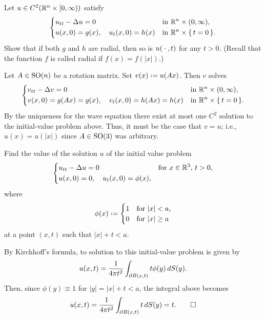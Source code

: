 \begin{problem}
  Let \(u\in C^2(\mathbb{R}^n\times[0,\infty))\) satisfy
  \[
    \left\{
      \begin{aligned}
        &u_{tt}-\Delta u=0&&\text{in \(\mathbb{R}^n\times(0,\infty),\)}\\
        &u(x,0)=g(x),\quad u_t(x,0)=h(x)&&\text{in \(\mathbb{R}^n\times\{\,t=0\,\}\).}
      \end{aligned}
    \right.
  \]
  Show that if both \(g\) and \(h\) are radial, then so is \(u({}\cdot{},t)\)
  for any \(t>0\). (Recall that the function \(f\) is called radial if
  \(f(x)=f(|x|)\).)
\end{problem}
\begin{solution*}
  Let \(A\in\operatorname{SO}(n)\) be a rotation matrix. Set \(v(x)\defeq u(Ax)\). Then
  \(v\) solves
  \[
    \left\{
      \begin{aligned}
        &v_{tt}-\Delta v=0&&\text{in \(\mathbb{R}^n\times(0,\infty),\)}\\
        &v(x,0)=g(Ax)=g(x),\quad v_t(x,0)=h(Ax)=h(x)&&\text{in
          \(\mathbb{R}^n\times\{\,t=0\,\}\).}
      \end{aligned}
    \right.
  \]
  By the uniqueness for the wave equation there exist at most one \(C^2\)
  solution to the initial-value problem above. Thus, it must be the case
  that \(v=u\); i.e., \(u(x)=u(|x|)\) since \(A\in\operatorname{SO}(3)\) was arbitrary.
\end{solution*}

\begin{problem}
  Find the value of the solution \(u\) of the initial value problem
  \[
    \left\{
      \begin{aligned}
        &u_{tt}-\Lap u=0&&\text{for \(x\in\R^3\), \(t>0\),}\\
        &u(x,0)=0,\quad u_t(x,0)=\phi(x),
      \end{aligned}
    \right.
  \]
  where
  \[
    \phi(x)\defeq
    \begin{cases}
      1&\text{for \(|x|<a\),}\\
      0&\text{for \(|x|\geq a\)}
    \end{cases}
  \]
  at a point \((x,t)\) such that \(|x|+t<a\).
\end{problem}
\begin{solution*}
  By Kirchhoff's formula, to solution to this initial-value problem is
  given by
  \[
    u(x,t)=\frac{1}{4\pi t^2}\int_{\partial B(x,t)} t\phi(y)\diff S(y).
  \]
  Then, since \(\phi(y)\equiv 1\) for \(|y|=|x|+t<a\), the integral above
  becomes
  \[
    u(x,t)=\frac{1}{4\pi t^2}\int_{\partial B(x,t)} t\mathop{}\!d S(y)=t.\qedhere
  \]
\end{solution*}

